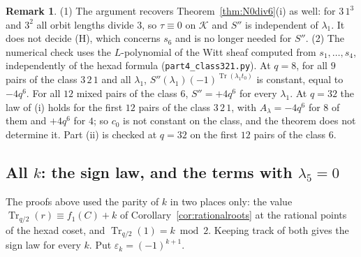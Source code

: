 \documentclass[12pt,a4paper]{amsart}
\theoremstyle{definition}
\newtheorem{remark}[theorem]{Remark}
\newcommand{\Tr}{\operatorname{Tr}}
\newcommand{\eps}{\varepsilon}
\newcommand{\Kk}{\mathcal{K}}
\newcommand{\Spp}{S''}
\begin{document}
\begin{remark}
(1) The argument recovers Theorem~\ref{thm:N0div6}(i) as well: for $3\,1^3$ and $3^2$ all orbit lengths divide $3$, so $\tau\equiv0$ on $\Kk$ and $\Spp$ is independent of $\lambda_1$. It does not decide (H), which concerns $s_6$ and is no longer needed for $\Spp$. (2) The numerical check uses the $L$-polynomial of the Witt sheaf computed from $s_1,\dots,s_4$, independently of the hexad formula (\texttt{part4\_class321.py}). At $q=8$, for all $9$ pairs of the class $3\,2\,1$ and all $\lambda_1$, $\Spp(\lambda_1)(-1)^{\Tr(\lambda_1t_0)}$ is constant, equal to $-4q^6$. For all $12$ mixed pairs of the class $6$, $\Spp=+4q^6$ for every $\lambda_1$. At $q=32$ the law of (i) holds for the first $12$ pairs of the class $3\,2\,1$, with $A_\lambda=-4q^6$ for $8$ of them and $+4q^6$ for $4$; so $c_0$ is not constant on the class, and the theorem does not determine it. Part (ii) is checked at $q=32$ on the first $12$ pairs of the class $6$.
\end{remark}

\subsection{All \texorpdfstring{$k$}{k}: the sign law, and the terms with \texorpdfstring{$\lambda_5=0$}{lambda5 = 0}}\label{subsec:allk}
The proofs above used the parity of $k$ in two places only: the value $\Tr_{q/2}(r)\equiv f_1(C)+k$ of Corollary~\ref{cor:rationalroots} at the rational points of the hexad coset, and $\Tr_{q/2}(1)=k\bmod2$. Keeping track of both gives the sign law for every $k$. Put $\eps_k=(-1)^{k+1}$.
\end{document}
